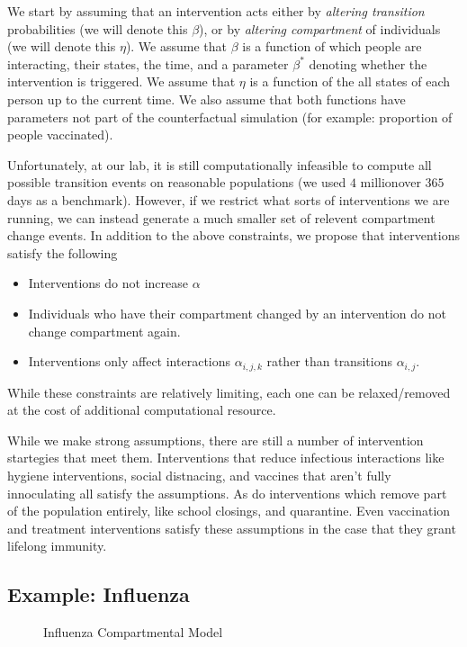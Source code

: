 \documentclass{article}
\begin{document}
We start by assuming that an intervention acts either by \emph{altering transition} probabilities (we will denote this $\beta$), or by \emph{altering compartment} of individuals (we will denote this $\eta$).  We assume that $\beta$ is a function of which people are interacting, their states, the time, and a parameter $\beta^*$ denoting whether the intervention is triggered.  We assume that $\eta$ is a function of the all states of each person up to the current time.  We also assume that both functions have parameters not part of the counterfactual simulation (for example: proportion of people vaccinated).

Unfortunately, at our lab, it is still computationally infeasible to compute all possible transition events on reasonable populations (we used $4$ millionover $365$ days as a benchmark).  However, if we restrict what sorts of interventions we are running, we can instead generate a much smaller set of relevent compartment change events.  In addition to the above constraints, we propose that interventions satisfy the following
\begin{itemize}
\item Interventions do not increase $\alpha$ 
\item Individuals who have their compartment changed by an intervention do not change compartment again.
\item Interventions only affect interactions $\alpha_{i,j,k}$ rather than transitions $\alpha_{i,j}$.
\end{itemize}
While these constraints are relatively limiting, each one can be relaxed/removed at the cost of additional computational resource. %

While we make strong assumptions, there are still a number of intervention startegies that meet them.  Interventions that reduce infectious interactions like hygiene interventions, social distnacing, and vaccines that aren't fully innoculating all satisfy the assumptions.  As do interventions which remove part of the population entirely, like school closings, and quarantine.  Even vaccination and treatment interventions satisfy these assumptions in the case that they grant lifelong immunity.

\subsection*{Example: Influenza}

\begin{figure}
\label{fig:sir}
\begin{center}
\end{center}
\caption{Influenza Compartmental Model}
\end{figure}
\end{document}

